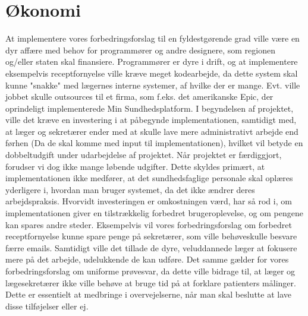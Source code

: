 \section{Økonomi}
At implementere vores forbedringsforslag til en fyldestgørende grad ville være en dyr affære med behov for programmører og andre designere, som regionen og/eller staten skal finansiere. Programmører er dyre i drift, og at implementere eksempelvis receptfornyelse ville kræve meget kodearbejde, da dette system skal kunne "snakke" med lægernes interne systemer, af hvilke der er mange. Evt. ville jobbet skulle outsources til et firma, som f.eks. det amerikanske Epic, der oprindeligt implementerede Min Sundhedsplatform. I begyndelsen af projektet, ville det kræve en investering i at påbegynde implementationen, samtidigt med, at læger og sekretærer ender med at skulle lave mere administrativt arbejde end førhen (Da de skal komme med input til implementationen), hvilket vil betyde en dobbeltudgift under udarbejdelse af projektet. Når projektet er færdiggjort, forudser vi dog ikke mange løbende udgifter. Dette skyldes primært, at implementationen ikke medfører, at det sundhedsfaglige personale skal oplæres yderligere i, hvordan man bruger systemet, da det ikke ændrer deres arbejdspraksis. Hvorvidt investeringen er omkostningen værd, har så rod i, om implementationen giver en tilstrækkelig forbedret brugeroplevelse, og om pengene kan spares andre steder. Eksempelvis vil vores forbedringsforslag om forbedret receptfornyelse kunne spare penge på sekretærer, som ville behøveskulle besvare færre emails. Samtidigt ville det tillade de dyre, veluddannede læger at fokusere mere på det arbejde, udelukkende de kan udføre. Det samme gælder for vores forbedringsforslag om uniforme prøvesvar, da dette ville bidrage til, at læger og lægesekretærer ikke ville behøve at bruge tid på at forklare patienters målinger. Dette er essentielt at medbringe i overvejelserne, når man skal beslutte at lave disse tilføjelser eller ej. 

